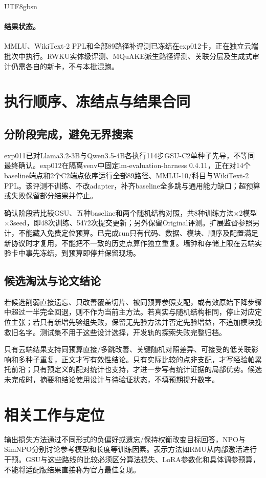 \documentclass[sigconf,anonymous,review]{acmart}
\begin{document}
\begin{CJK*}{UTF8}{gbsn}
\paragraph{结果状态。}MMLU、WikiText-2 PPL和全部89路径补评测已冻结在exp012卡，正在独立云端批次中执行。RWKU实体级评测、MQuAKE派生路径评测、关联分层及生成式审计仍需各自的新卡，不与本批混跑。

\section{执行顺序、冻结点与结果合同}
\subsection{分阶段完成，避免无界搜索}
exp011已对Llama3.2-3B与Qwen3.5-4B各执行114步GSU-C2单种子先导，不等同最终确认。exp012在隔离venv中固定lm-evaluation-harness 0.4.11，正在对14个baseline端点和2个C2端点依序运行全部89路径、MMLU-10/科目与WikiText-2 PPL。该评测不训练、不改adapter，补齐baseline全多跳与通用能力缺口；超预算或失败保留部分结果并停止。

确认阶段若比较GSU、五种baseline和两个随机结构对照，共8种训练方法$\times$2模型$\times$3seed，即48次训练、5472次提交更新；另外保留Original评测。扩展监督参照另计，不能藏入免费定位预算。已完成run只有代码、数据、模块、顺序及配置满足新协议时才复用，不能把不一致的历史点算作独立重复。墙钟和存储上限在云端实验卡中事先冻结，到预算即停并保留现场。

\subsection{候选淘汰与论文结论}
若候选削弱直接遗忘、只改善覆盖切片、被同预算参照支配，或有效原始下降步骤中超过一半完全回退，则不作为当前主方法。若真实与随机结构相同，停止对应定位主张；若只有新增先验组失败，保留无先验方法并否定先验增益，不追加模块挽救旧名字。测试集不用于这些设计选择，开发轨的探索失败完整归档。

只有云端结果支持同预算直接/多跳改善、关键随机对照差异、可接受的低关联影响和多种子重复，正文才写有效性结论。只有实际比较的点非支配，才写经验帕累托前沿；只有预定义的配对统计也支持，才进一步写有统计证据的局部优势。候选未完成时，摘要和结论使用设计与待验证状态，不填预期提升数字。

\section{相关工作与定位}
输出损失方法通过不同形式的负偏好或遗忘/保持权衡改变目标回答，NPO与SimNPO分别讨论参考模型和长度等训练因素\cite{npo,simnpo}。表示方法如RMU从内部激活进行干预\cite{wmdp}。GSU与这些路线的比较必须区分算法损失、LoRA参数化和具体调参预算，不能将适配版结果直接称为官方最佳复现。


\end{CJK*}
\end{document}
